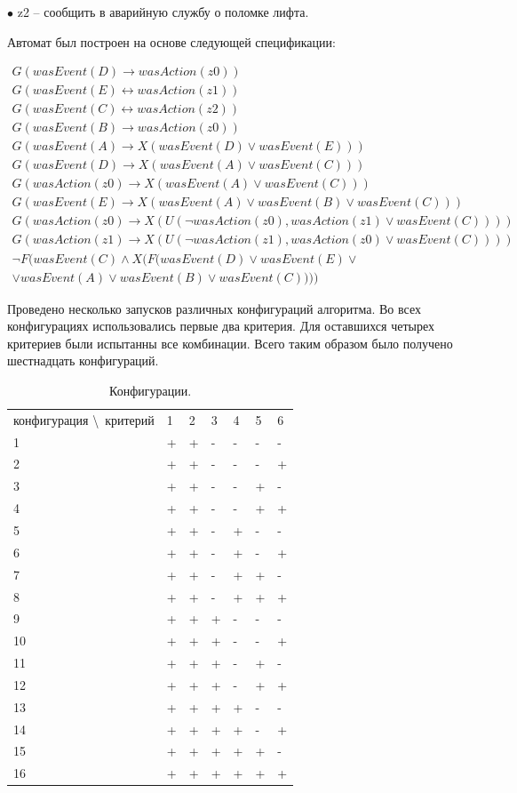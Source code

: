\documentclass[12pt,fleqn]{article}
\begin{document}
$\bullet$ z2 -- сообщить в аварийную службу о поломке лифта.

Автомат был построен на основе следующей спецификации:

\begin{multline*}
G(wasEvent(D) \rightarrow wasAction(z0))\\
G(wasEvent(E) \leftrightarrow wasAction(z1))\\
G(wasEvent(C) \leftrightarrow wasAction(z2))\\
G(wasEvent(B) \rightarrow wasAction(z0))\\
G(wasEvent(A) \rightarrow X(wasEvent(D) \vee wasEvent(E)))\\
G(wasEvent(D) \rightarrow X(wasEvent(A) \vee wasEvent(C)))\\
G(wasAction(z0) \rightarrow X(wasEvent(A) \vee wasEvent(C)))\\
G(wasEvent(E) \rightarrow X(wasEvent(A) \vee wasEvent(B) \vee wasEvent(C)))\\
G(wasAction(z0) \rightarrow X(U(\lnot wasAction(z0), wasAction(z1) \vee wasEvent(C))))\\
G(wasAction(z1) \rightarrow X(U(\lnot wasAction(z1), wasAction(z0) \vee wasEvent(C))))\\
\lnot F(wasEvent(C) \wedge X(F(wasEvent(D) \vee wasEvent(E) \vee \\ \vee wasEvent(A) \vee wasEvent(B) \vee wasEvent(C))))
\end{multline*}

Проведено несколько запусков различных конфигураций алгоритма. Во всех конфигурациях использовались первые два критерия.
Для оставшихся четырех критериев были испытанны все комбинации. Всего таким образом было получено шестнадцать конфигураций.

\begin{table}
\centering
\begin{tabular}{ l | l | l | l | l | l | l }
конфигурация \textbackslash \ критерий & 1 & 2 & 3 & 4 & 5 & 6 \\
1  & + & + & - & - & - & - \\
2  & + & + & - & - & - & + \\
3  & + & + & - & - & + & - \\
4  & + & + & - & - & + & + \\
5  & + & + & - & + & - & - \\
6  & + & + & - & + & - & + \\
7  & + & + & - & + & + & - \\
8  & + & + & - & + & + & + \\
9  & + & + & + & - & - & - \\
10 & + & + & + & - & - & + \\
11 & + & + & + & - & + & - \\
12 & + & + & + & - & + & + \\
13 & + & + & + & + & - & - \\
14 & + & + & + & + & - & + \\
15 & + & + & + & + & + & - \\
16 & + & + & + & + & + & + \\
\end{tabular}
\caption{Конфигурации.}
\end{table}
\end{document}
